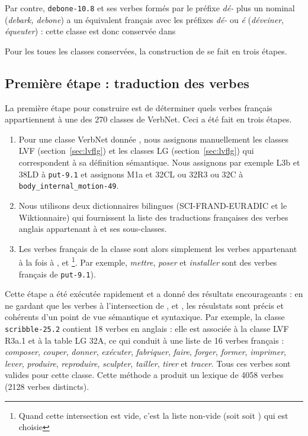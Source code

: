 Par contre, {\color{blue}\texttt{debone-10.8}} et ses verbes formés par le
préfixe \textit{dé-} plus un nominal (\textit{debark, debone}) a un équivalent
français avec les préfixes \textit{dé-} ou \textit{é} (\textit{déveiner},
\textit{équeuter}) : cette classe est donc conservée dans \verbenet{}

Pour les toues les classes conservées, la construction de \verbenet{} se fait
en trois étapes.

\subsection{Première étape : traduction des verbes}\label{first}

La première étape pour construire \verbenet{} est de déterminer quels verbes
français appartiennent à une des 270 classes de VerbNet. Ceci a été fait en
trois étapes.

\begin{enumerate}
    \item Pour une classe VerbNet donnée \Ce{}, nous assignons manuellement les
        classes LVF (section~\ref{sec:lvflg}) \Clvf{} et les classes LG
        (section~\ref{sec:lvflg}) \Clg{} qui correspondent à sa définition
        sémantique. Nous assignons par exemple {\color{red}L3b} et
        {\color{green}38LD} à {\color{blue}\texttt{put-9.1}} et assignons
        {\color{red}M1a} et {\color{green}32CL ou 32R3 ou 32C} à
        {\color{blue}\texttt{body\_internal\_motion-49}}.
    \item Nous utilisons deux dictionnaires bilingues (SCI-FRAND-EURADIC et le
        Wiktionnaire) qui fournissent la liste \Ltrad{} des traductions
        françaises des verbes anglais appartenant à \Ce{} et ses sous-classes.
    \item Les verbes français de la classe \Ce{} sont alors simplement les
        verbes appartenant à la fois à \Ltrad{}, \Clvf{} et
        \Clg{}\footnote{Quand cette intersection est vide, c'est la liste
        non-vide (soit \Clvf{} soit \Clg{}) qui est choisie}. Par exemple,
        \textit{mettre}, \textit{poser} et \textit{installer} sont des verbes
        français de {\color{blue}\texttt{put-9.1}}).
\end{enumerate}

Cette étape a été exécutée rapidement et a donné des résultats encourageants :
en ne gardant que les verbes à l'intersection de \Ltrad{}, \Clvf{} et \Clg{},
les résulstats sont précis et cohérents d'un point de vue sémantique et
syntaxique. Par exemple, la classe {\color{blue}\texttt{scribble-25.2}}
contient 18 verbes en anglais : elle est associée à la classe LVF
{\color{red}R3a.1} et à la table LG {\color{green}32A}, ce qui conduit à une
liste de 16 verbes français : \textit{composer}, \textit{couper}, \textit{donner},
\textit{exécuter}, \textit{fabriquer}, \textit{faire}, \textit{forger}, \textit{former},
\textit{imprimer}, \textit{lever}, \textit{produire}, \textit{reproduire},
\textit{sculpter}, \textit{tailler}, \textit{tirer} et \textit{tracer}. Tous ces verbes
sont valides pour cette classe.  Cette méthode a produit un lexique de 4058
verbes (2128 verbes distincts).

